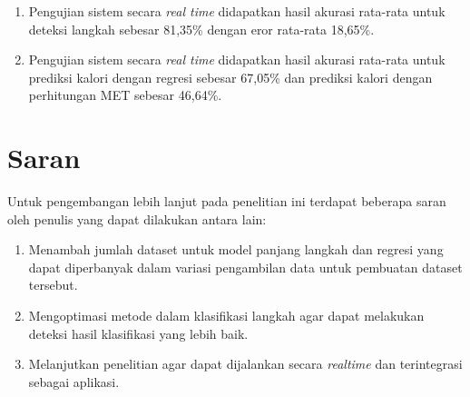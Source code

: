 \begin{enumerate}[nolistsep]
  \item Pengujian sistem secara \emph{real time} didapatkan hasil akurasi rata-rata untuk deteksi langkah sebesar 81,35\% dengan eror rata-rata 18,65\%.
  
  \item Pengujian sistem secara \emph{real time} didapatkan hasil akurasi rata-rata untuk prediksi kalori dengan regresi sebesar 67,05\% dan prediksi kalori dengan perhitungan MET sebesar 46,64\%.

\end{enumerate}

\section{Saran}
\label{chap:saran}

Untuk pengembangan lebih lanjut pada penelitian ini terdapat beberapa saran oleh penulis yang dapat dilakukan antara lain:

\begin{enumerate}[nolistsep]

  \item Menambah jumlah dataset untuk model panjang langkah dan regresi yang dapat diperbanyak dalam variasi pengambilan data untuk pembuatan dataset tersebut.
  
  \item Mengoptimasi metode dalam klasifikasi langkah agar dapat melakukan deteksi hasil klasifikasi yang lebih baik.
  
  \item Melanjutkan penelitian agar dapat dijalankan secara \emph{realtime} dan terintegrasi sebagai aplikasi.

\end{enumerate}

